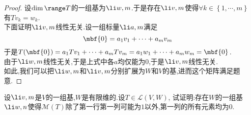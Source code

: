\documentclass{ctexart}
\begin{document}
\begin{proof}
    设$\dim\range T$的一组基为$\li w,m$.于是存在$\li v,m$使得$\forall k\in\left\{1,\cdots,m\right\}$有$Tv_k=w_k$.\\
    下面证明$\li v,m$线性无关.设一组标量$\li a,m$满足
    $$\mbf{0}=a_1v_1+\cdots+a_mv_m$$
    于是$T(\mbf{0})=a_1Tv_1+\cdots+a_mTv_m=a_1w_1+\cdots+a_mw_m=\mbf{0}$.\\
    由于$\li w,m$线性无关,于是上式中各$a$均仅能为$0$,于是$\li v,m$线性无关.\\
    如此,我们可以把$\li w,m$和$\li v,m$分别扩展为$W$和$V$的基,进而这个矩阵满足题意.
\end{proof}
\begin{problem}[6.]
    设$\li v,m$是$V$的一组基,$W$是有限维的.设$T\in\mathcal{L}(V,W)$,%
    试证明:存在$W$的一组基$\li w,n$使得$\mathcal{M}(T)$除了第一行第一列可能为$1$以外,第一列的所有元素均为$0$.
\end{problem}
\end{document}
